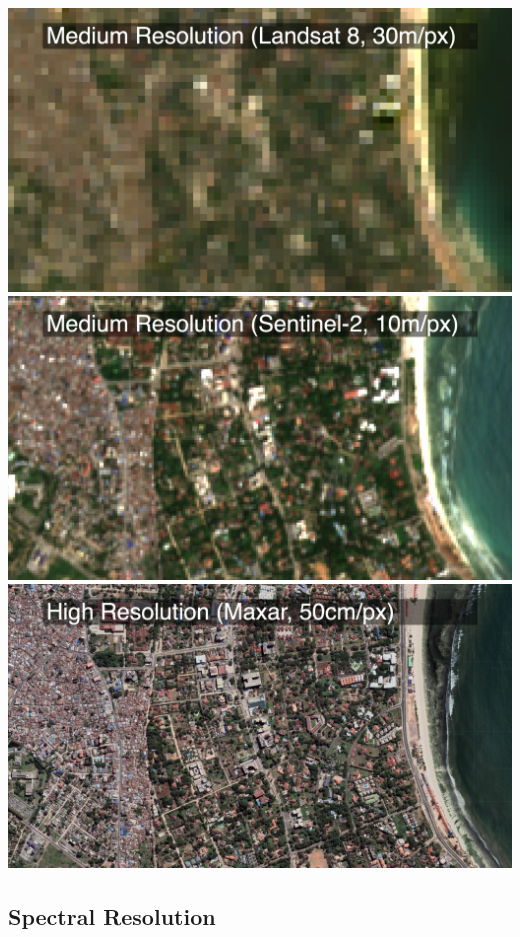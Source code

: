 \documentclass[
  letterpaper,
  DIV=11,
  numbers=noendperiod]{scrreprt}
\begin{document}
\includegraphics{././images/Landsat.png}
\includegraphics{././images/Sentinel2.png}
\includegraphics{././images/Maxar.png}

\hypertarget{spectral-resolution}{%
\subsection{Spectral Resolution}\label{spectral-resolution}}
\end{document}
